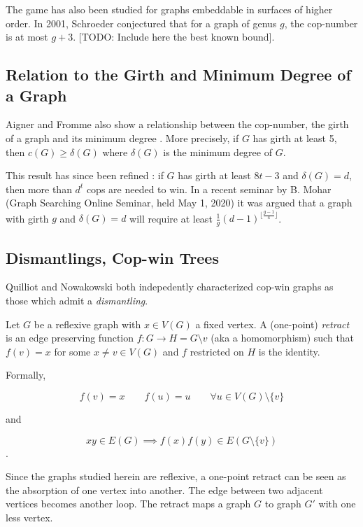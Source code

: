 The game has also been studied for graphs embeddable in surfaces of higher order.
In 2001, Schroeder conjectured \cite{bonato2017topological} that for a graph of genus $g$,
the cop-number is at most $g+3$. [TODO: Include here the best known bound].

\subsection{Relation to the Girth and Minimum Degree of a Graph}

Aigner and Fromme also show a relationship between the cop-number, the girth of a graph and
its minimum degree \cite{aigner1984game}. More precisely, if $G$ has girth at least 5, then $c(G)\geq \delta(G)$ where $\delta(G)$ is the minimum degree of $G$.

This result has since been refined \cite{frankl1987cops}: if $G$ has girth at least $8t-3$ and $\delta(G) = d$, then more than $d^t$ cops are needed to win. In a recent
seminar by B. Mohar (Graph Searching Online Seminar, held May 1, 2020) it was
argued that a graph with girth $g$ and $\delta(G)=d$ will require at least $\tfrac{1}{g}(d-1)^{\lfloor \frac{g-1}{4} \rfloor}$.

\subsection{Dismantlings, Cop-win Trees \label{intro dismantlings}}

Quilliot and Nowakowski both indepedently characterized cop-win graphs as those which
admit a \textit{dismantling}.

Let $G$ be a reflexive graph with $x\in V(G)$ a fixed vertex. A (one-point) \textit{retract} is an edge preserving function $f : G \rightarrow H = G \setminus v$
(aka a homomorphism) such that $f(v) = x$ for some $x \neq v \in V(G)$ and $f$ restricted on $H$ is the identity.

Formally,

\[ f(v) = x \qquad f(u) = u \qquad \forall u \in V(G)\setminus \{ v \} \]

and

\[ xy \in E(G) \implies f(x)f(y) \in E(G \setminus \{ v \}) \].

Since the graphs studied herein are reflexive, a one-point retract can be seen as the
absorption of one vertex into another. The edge between two adjacent vertices becomes another loop.
The retract maps a graph $G$ to graph $G'$ with one less vertex.

